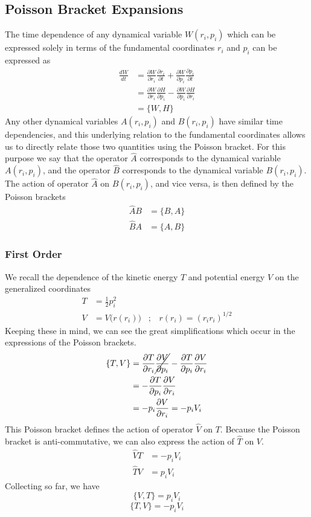 \documentclass[8pt,a4paper]{article}
\begin{document}
	\subsection{Poisson Bracket Expansions}
	The time dependence of any dynamical variable $W(r_i, p_i)$ which can be expressed solely in terms of the fundamental coordinates $r_i$ and $p_i$ can be expressed as
	\begin{align}
		\frac{dW}{dt} &= \frac{\partial W}{\partial r_i} \frac{\partial r_i}{\partial t} + \frac{\partial W}{\partial p_i} \frac{\partial p_i}{\partial t} \\
		&= \frac{\partial W}{\partial r_i} \frac{\partial H}{\partial p_i} - \frac{\partial W}{\partial p_i} \frac{\partial H}{\partial r_i }	\\
		&= \{W,H\}
	\end{align}
	Any other dynamical variables $A(r_i, p_i)$  and $B(r_i, p_i)$ have similar time dependencies, and this underlying relation to the fundamental coordinates allows us to directly relate those two quantities using the Poisson bracket. For this purpose we say that the operator $\hat{A}$ corresponds to the dynamical variable $A(r_i, p_i)$, and the operator $\hat{B}$ corresponds to the dynamical variable $B(r_i, p_i)$. The action of operator $\hat{A}$ on $B(r_i, p_i)$, and vice versa, is then defined by the Poisson brackets
	\begin{align}
		\hat{A} B &= \{B, A\} \\
		\hat{B} A &= \{A, B\}
	\end{align}
	\subsubsection{First Order}
	We recall the dependence of the kinetic energy $T$ and potential energy $V$ on the generalized coordinates
	\begin{align*}
		T &= \frac{1}{2}p_i^2 \\
		V &= V\Big(r(r_i)\Big)\;\;\;;\;\;\;r(r_i)=(r_i r_i)^{1/2}
	\end{align*}
	Keeping these in mind, we can see the great simplifications which occur in the expressions of the Poisson brackets.
	\begin{align}
		\{T,V\} &= \frac{\partial T}{\partial r_i} \cancel{\frac{\partial V}{\partial p_i}} - \frac{\partial T}{\partial p_i} \frac{\partial V}{\partial r_i } \\
		&= - \frac{\partial T}{\partial p_i} \frac{\partial V}{\partial r_i } \\
		&= -p_i\frac{\partial V}{\partial r_i } = -p_i V_i
	\end{align}
	This Poisson bracket defines the action of operator $\hat{V}$ on $T$. Because the Poisson bracket is anti-commutative, we can also express the action of $\hat{T}$ on $V$.
	\begin{align}
		\hat{V}T &= -p_i V_i \\
		\hat{T}V &=  p_i V_i
	\end{align}
	Collecting so far, we have
	\begin{equation}
		\boxed{\{V,T\} = p_i V_i}
	\end{equation}
	\begin{equation}
		\boxed{\{T,V\} = -p_i V_i}
	\end{equation}
\end{document}
